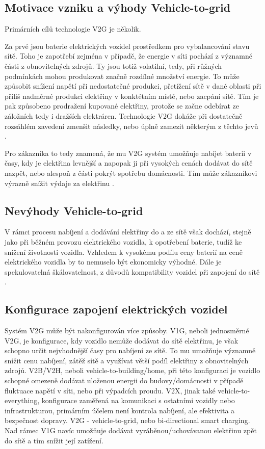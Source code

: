 \documentclass[12pt,a4paper]{article}
\begin{document}
\subsection{Motivace vzniku a výhody Vehicle-to-grid}
Primárních cílů technologie V2G je několik.

Za prvé jsou baterie elektrických vozidel prostředkem pro vybalancování stavu sítě. Toho je zapotřebí zejména v případě, že energie v síti pochází z významné části z obnovitelných zdrojů. Ty jsou totiž volatilní, tedy, při růžných podmínkách mohou produkovat značně rozdílné množství energie. To může způsobit snížení napětí při nedostatečné produkci, přetížení sítě v dané oblasti při příliš nadměrné produkci elektřiny v konktétním místě, nebo zacpání sítě. Tím je pak způsobeno prodražení kupované elektřiny, protože se začne odebírat ze záložních tedy i dražších elektráren. Technologie V2G dokáže při dostatečně rozsáhlém zavedení zmenšit následky, nebo úplně zamezit některým z těchto jevů
\cite{Greaker-Hagem-Proost-2022}.

Pro zákazníka to tedy znamená, že mu V2G systém umožňuje nabíjet baterii v časy, kdy je elektřina levnější a napopak ji při vysokých cenách dodávat do sítě nazpět, nebo alespoň z části pokrýt spotřebu domácnosti. Tím může zákazníkovi výrazně snížit výdaje za elektřinu 
\cite{Virta-Ltd-2021}.

\subsection{Nevýhody Vehicle-to-grid}
V rámci procesu nabíjení a dodávání elektřiny do a ze sítě však dochází, stejně jako při běžném provozu elektrického vozidla, k opotřebení baterie, tudíž ke snížení životnosti vozidla. Vzhledem k vysokému podílu ceny baterií na ceně elektrického vozidla by to nemuselo být ekonomicky výhodné.
Dále je spekulovatelná škálovatelnost, z důvodů kompatibility vozidel při zapojení do sítě 
\cite{Lakshmi-Divya-Sravani-2019}.

\subsection{Konfigurace zapojení elektrických vozidel}
Systém V2G může být nakonfigurován více způsoby.
V1G, neboli jednosměrné V2G, je konfigurace, kdy vozidlo nemůže dodávat do sítě elektřinu,
je však schopno určit nejvhodnější časy pro nabíjení ze sítě. To mu umožňuje významně snížit cenu nabíjení, zátěž sítě a využívat větší podíl elektřiny z obnovitelných zdrojů.
V2B/V2H, neboli vehicle-to-building/home, při této konfiguraci je vozidlo schopné omezeně dodávat uloženou energii do budovy/domácnosti v případě fluktuace napětí v síti, nebo při výpadcích proudu.
V2X, jinak také vehicle-to-everything, konfigurace zaměřená na komunikaci s ostatními vozidly nebo infrastrukturou, primárním účelem není kontrola nabíjení, ale efektivita a bezpečnost dopravy.
V2G - vehicle-to-grid, nebo bi-directional smart charging. Nad rámec V1G  navíc umožňuje dodávat vyráběnou/uchovávanou elektřinu zpět do sítě a tím snížit její zatížení\cite{Svarc-2022}.
\end{document}
